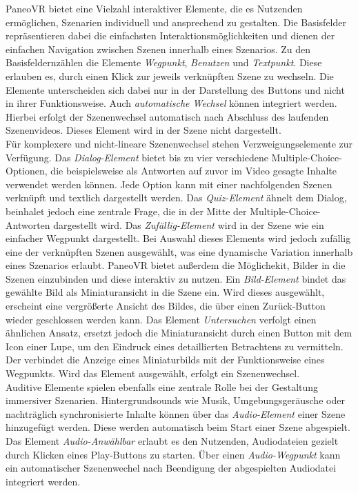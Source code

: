 PaneoVR bietet eine Vielzahl interaktiver Elemente, die es Nutzenden ermöglichen, Szenarien individuell und ansprechend zu gestalten. Die Basisfelder repräsentieren dabei die einfachsten Interaktionsmöglichkeiten und dienen der einfachen Navigation zwischen Szenen innerhalb eines Szenarios. Zu den Basisfeldernzählen die Elemente \textit{Wegpunkt}, \textit{Benutzen} und \textit{Textpunkt}. Diese erlauben es, durch einen Klick zur jeweils verknüpften Szene zu wechseln. Die Elemente unterscheiden sich dabei nur in der Darstellung des Buttons und nicht in ihrer Funktionsweise. Auch \textit{automatische Wechsel} können integriert werden. Hierbei erfolgt der Szenenwechsel automatisch nach Abschluss des laufenden Szenenvideos. Dieses Element wird in der Szene nicht dargestellt. \\
Für komplexere und nicht-lineare Szenenwechsel stehen Verzweigungselemente zur Verfügung. Das \textit{Dialog-Element} bietet bis zu vier verschiedene Multiple-Choice-Optionen, die beispielsweise als Antworten auf zuvor im Video gesagte Inhalte verwendet werden können. Jede Option kann mit einer nachfolgenden Szenen verknüpft und textlich dargestellt werden. Das \textit{Quiz-Element} ähnelt dem Dialog, beinhalet jedoch eine zentrale Frage, die in der Mitte der  Multiple-Choice-Antworten dargestellt wird. Das \textit{Zufällig-Element} wird in der Szene wie ein einfacher Wegpunkt dargestellt. Bei Auswahl dieses Elements wird jedoch zufällig eine der verknüpften Szenen ausgewählt, was eine dynamische Variation innerhalb eines Szenarios erlaubt.
PaneoVR bietet außerdem die Möglichekit, Bilder in die Szenen einzubinden und diese interaktiv zu nutzen. Ein \textit{Bild-Element} bindet das gewählte Bild als Miniaturansicht in die Szene ein. Wird dieses ausgewählt, erscheint eine vergrößerte Ansicht des Bildes, die über einen Zurück-Button wieder geschlossen werden kann. Das Element \textit{Untersuchen} verfolgt einen ähnlichen Ansatz, ersetzt jedoch die Miniaturansicht durch einen Button mit dem Icon einer Lupe, um den Eindruck eines detaillierten Betrachtens zu vermitteln. Der  verbindet die Anzeige eines Miniaturbilds mit der Funktionsweise eines Wegpunkts. Wird das Element ausgewählt, erfolgt ein Szenenwechsel. \\
Auditive Elemente spielen ebenfalls eine zentrale Rolle bei der Gestaltung immersiver Szenarien. Hintergrundsounds wie Musik, Umgebungsgeräusche oder nachträglich synchronisierte Inhalte können über das \textit{Audio-Element} einer Szene hinzugefügt werden. Diese werden automatisch beim Start einer Szene abgespielt. Das Element \textit{Audio-Anwählbar} erlaubt es den Nutzenden, Audiodateien gezielt durch Klicken eines Play-Buttons zu starten. Über einen \textit{Audio-Wegpunkt} kann ein automatischer Szenenwechel nach Beendigung der abgespielten Audiodatei integriert werden. \\

